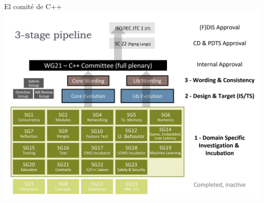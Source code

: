 \begin{frame}[t]{El comité de C++}
\vspace{-.75em}
\noindent
\centering
\includegraphics[height=.9\textheight]{img/wg21-structure-2022.png}
\end{frame}

